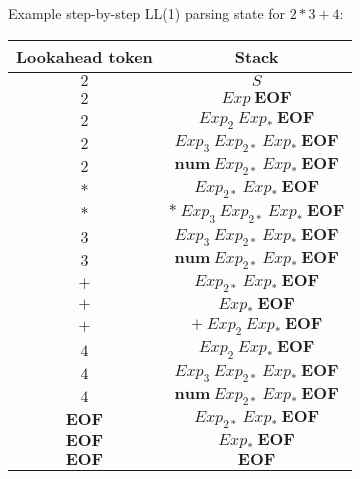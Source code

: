 \begin{exercise}{}
\begin{solution}
\begin{enumerate}
      Example step-by-step LL(1) parsing state for \(2 * 3 + 4\):
      \begin{center}
        \begin{tabular}{c c}
          Lookahead token & Stack \\
          \hline
          \(2\) & \(S\) \\
          \(2\) & \(Exp ~ \mathbf{EOF}\) \\
          \(2\) & \(Exp_2 ~ Exp_* ~ \mathbf{EOF}\) \\
          \(2\) & \(Exp_3 ~ Exp_{2*} ~ Exp_* ~ \mathbf{EOF}\) \\
          \(2\) & \(\mathbf{num} ~ Exp_{2*} ~ Exp_* ~ \mathbf{EOF}\) \\
          \(*\) & \(Exp_{2*} ~ Exp_* ~ \mathbf{EOF}\) \\
          \(*\) & \(* ~Exp_3 ~ Exp_{2*} ~ Exp_* ~ \mathbf{EOF}\) \\
          \(3\) & \(Exp_3 ~ Exp_{2*} ~ Exp_* ~ \mathbf{EOF}\) \\
          \(3\) & \(\mathbf{num} ~ Exp_{2*} ~ Exp_* ~ \mathbf{EOF}\) \\
          \(+\) & \(Exp_{2*} ~ Exp_* ~ \mathbf{EOF}\) \\
          \(+\) & \(Exp_* ~ \mathbf{EOF}\) \\
          \(+\) & \(+ ~Exp_2 ~Exp_* ~ \mathbf{EOF}\) \\
          \(4\) & \(Exp_2 ~Exp_* ~ \mathbf{EOF}\) \\
          \(4\) & \(Exp_3 ~Exp_{2*} ~Exp_* ~ \mathbf{EOF}\) \\
          \(4\) & \(\mathbf{num} ~Exp_{2*} ~Exp_* ~ \mathbf{EOF}\) \\
          \(\mathbf{EOF}\) & \(Exp_{2*} ~Exp_* ~ \mathbf{EOF}\) \\
          \(\mathbf{EOF}\) & \(Exp_* ~ \mathbf{EOF}\) \\
          \(\mathbf{EOF}\) & \(\mathbf{EOF}\) \\
        \end{tabular}
      \end{center}
    \end{enumerate}
  \end{solution}

\end{exercise}

